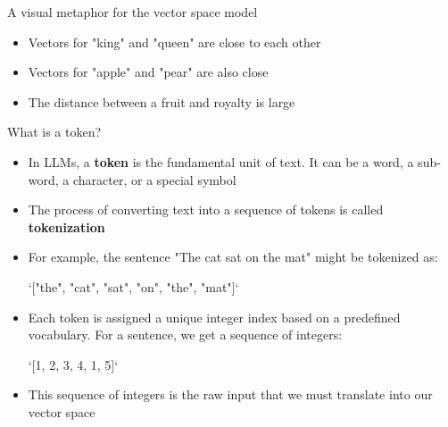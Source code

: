 \documentclass[aspectratio=169]{beamer}\usepackage[]{graphicx}\usepackage[]{xcolor}
\makeatletter
\newcommand{\defword}[1]{\textbf{\textcolor{beamer@blendedblue}{#1}}}
\makeatother
\begin{document}
\begin{frame}{A visual metaphor for the vector space model}
\begin{center}
\end{center}
\begin{itemize}
    \item Vectors for "king" and "queen" are close to each other
    \vfill
    \item Vectors for "apple" and "pear" are also close
    \vfill
    \item The distance between a fruit and royalty is large
\end{itemize}
\end{frame}

\begin{frame}{What is a token?}
\begin{itemize}
    \item In LLMs, a \defword{token} is the fundamental unit of text. It can be a word, a sub-word, a character, or a special symbol
    \vfill
    \item The process of converting text into a sequence of tokens is called \defword{tokenization}
    \vfill
    \item For example, the sentence "The cat sat on the mat" might be tokenized as:
    \vfill
    \begin{center}
        `["the", "cat", "sat", "on", "the", "mat"]`
    \end{center}
    \vfill
    \item Each token is assigned a unique integer index based on a predefined vocabulary. For a sentence, we get a sequence of integers:
    \vfill
    \begin{center}
        `[1, 2, 3, 4, 1, 5]`
    \end{center}
    \vfill
    \item This sequence of integers is the raw input that we must translate into our vector space
\end{itemize}
\end{frame}
\end{document}
